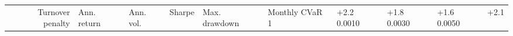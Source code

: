 \begin{tabular}{rlllllll}
\toprule
Turnover penalty & Ann. return & Ann. vol. & Sharpe & Max. drawdown & Monthly CVaR 1%
 & +2.2%
0.0010 & +1.8%
0.0030 & +1.6%
0.0050 & +2.1%
\bottomrule
\end{tabular}
